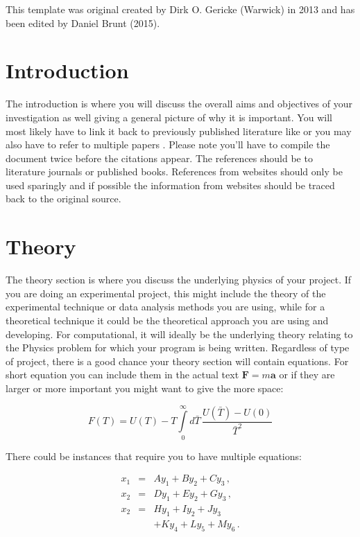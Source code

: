 \documentclass[a4paper,12pt, notitlepage]{article}
\begin{document}
This template was original created by Dirk O. Gericke (Warwick) in 2013 and has been edited by Daniel Brunt (2015). 


\section{Introduction}
The introduction is where you will discuss the overall aims and objectives of your investigation as well giving a general picture of why it is important. You will most likely have to link it back to previously published literature like  \cite{Paper_1} or you may also have to refer to multiple papers \cite{Paper_1, Paper_2, Paper_3}. Please note you'll have to compile the document twice before the citations appear. The references should be to literature journals or published books. References from websites should only be used sparingly and if possible the information from websites should be traced back to the original source. 




\section{Theory}
The theory section is where you discuss the underlying physics of your project. If you are doing an experimental project, this might include the theory of the experimental technique or data analysis methods you are using, while for a theoretical technique it could be the theoretical approach you are using and developing. For computational, it will ideally be the underlying theory relating to the Physics problem for which your program is being written. Regardless of type of project, there is a good chance your theory section will contain equations. For short equation you can include them in the actual text $\mathbf{F} = m\mathbf{a}$ or if they are larger or more important you might want to give the more space:

\begin{equation}
F(T) = U(T) - T \int\limits_0^\infty d \bar{T} \, \frac{U(\bar{T}) - U(0)}{\bar{T}^2}
\end{equation}

There could be instances that require you to have multiple equations:

\begin{eqnarray}
x_1 &=& A y_1 + B y_2 + C y_3    \,, \\
x_2 &=& D y_1 + E y_2 + G y_3    \,, \\ 
x_2 &=& H y_1 + I y_2 + J y_3    \nonumber\\
    &~& + K y_4 + L y_5 + M y_6  \,. 
\label{eq: eq_2}
\end{eqnarray}
\end{document}
